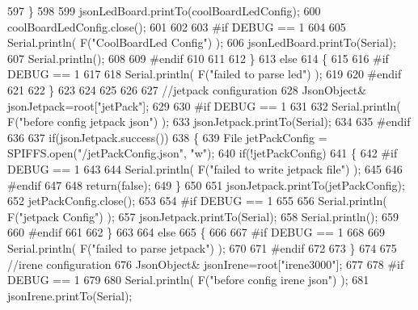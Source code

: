 \begin{DoxyCode}
597         \}
598         
599         jsonLedBoard.printTo(coolBoardLedConfig);
600         coolBoardLedConfig.close();
601 
602 
603 \textcolor{preprocessor}{    #if DEBUG == 1 }
604 
605         Serial.println( F(\textcolor{stringliteral}{"CoolBoardLed Config"}) );     
606         jsonLedBoard.printTo(Serial);
607         Serial.println();
608     
609 \textcolor{preprocessor}{    #endif}
610 
611     
612     \}
613     \textcolor{keywordflow}{else}
614     \{
615     
616 \textcolor{preprocessor}{    #if DEBUG == 1 }
617 
618         Serial.println( F(\textcolor{stringliteral}{"failed to parse led"}) );
619     
620 \textcolor{preprocessor}{    #endif }
621 
622     \}
623         
624 
625     
626 
627     \textcolor{comment}{//jetpack configuration}
628         JsonObject& jsonJetpack=root[\textcolor{stringliteral}{"jetPack"}];
629 
630 \textcolor{preprocessor}{#if DEBUG == 1 }
631 
632     Serial.println( F(\textcolor{stringliteral}{"before config jetpack json"}) );
633     jsonJetpack.printTo(Serial);
634 
635 \textcolor{preprocessor}{#endif}
636 
637     \textcolor{keywordflow}{if}(jsonJetpack.success())
638     \{   
639         File jetPackConfig = SPIFFS.open(\textcolor{stringliteral}{"/jetPackConfig.json"}, \textcolor{stringliteral}{"w"});   
640         \textcolor{keywordflow}{if}(!jetPackConfig)
641         \{
642 \textcolor{preprocessor}{        #if DEBUG == 1}
643 
644             Serial.println( F(\textcolor{stringliteral}{"failed to write jetpack file"}) );
645         
646 \textcolor{preprocessor}{        #endif}
647 
648             \textcolor{keywordflow}{return}(\textcolor{keyword}{false});
649         \}
650 
651         jsonJetpack.printTo(jetPackConfig);
652         jetPackConfig.close();
653 
654 \textcolor{preprocessor}{    #if DEBUG == 1}
655 
656         Serial.println( F(\textcolor{stringliteral}{"jetpack Config"}) );  
657         jsonJetpack.printTo(Serial);
658         Serial.println();
659     
660 \textcolor{preprocessor}{    #endif}
661 
662     \}
663 
664     \textcolor{keywordflow}{else}
665     \{
666     
667 \textcolor{preprocessor}{    #if DEBUG == 1 }
668 
669         Serial.println( F(\textcolor{stringliteral}{"failed to parse jetpack"}) ); 
670     
671 \textcolor{preprocessor}{    #endif}
672 
673     \}
674     
675     \textcolor{comment}{//irene configuration   }
676         JsonObject& jsonIrene=root[\textcolor{stringliteral}{"irene3000"}];
677     
678 \textcolor{preprocessor}{#if DEBUG == 1 }
679 
680     Serial.println( F(\textcolor{stringliteral}{"before config irene json"}) );    
681     jsonIrene.printTo(Serial);

\end{DoxyCode}
